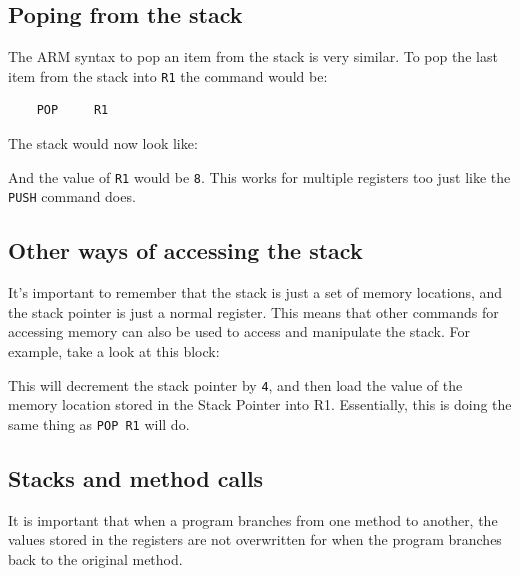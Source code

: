 \documentclass{article}
\begin{document}
\subsection{Poping from the stack}

The ARM syntax to pop an item from the stack is very similar. To pop the last
item from the stack into {\tt R1} the command would be:

\begin{verbatim}
	POP 	R1
\end{verbatim}

The stack would now look like:

\begin{center}
\begin{drawstack}
		
		
		
		
		
\end{drawstack}
\end{center}

And the value of {\tt R1} would be {\tt 8}. This works for multiple registers
too just like the {\tt PUSH} command does.

\subsection{Other ways of accessing the stack}

It's important to remember that the stack is just a set of memory locations, and
the stack pointer is just a normal register. This means that other commands for
accessing memory can also be used to access and manipulate the stack. For
example, take a look at this block:


This will decrement the stack pointer by {\tt 4}, and then load the value of the
memory location stored in the Stack Pointer into R1. Essentially, this is doing
the same thing as {\tt POP R1} will do.

\subsection{Stacks and method calls}

It is important that when a program branches from one method to another, the
values stored in the registers are not overwritten for when the program branches
back to the original method.
\end{document}
